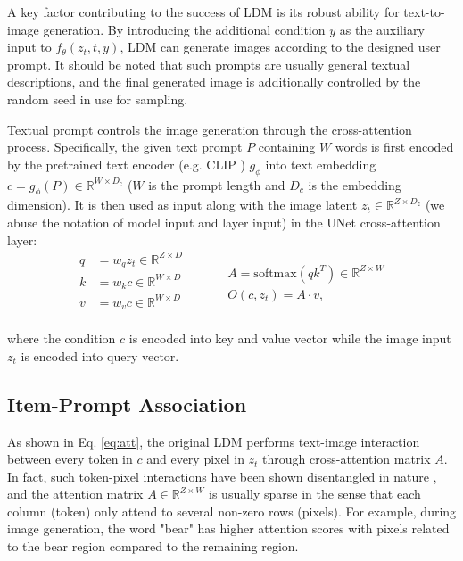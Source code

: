  A key factor contributing to the success of LDM is its robust ability for text-to-image generation.
By introducing the additional condition $y$ as the auxiliary input to $f_\theta(z_t,t,y)$, LDM can generate images according to the designed user prompt. 
It should be noted that such prompts are usually general textual descriptions, and the final generated image is additionally controlled by the random seed in use for sampling. 

Textual prompt controls the image generation through the cross-attention process.
Specifically, the given text prompt $P$ containing $W$ words is first encoded by the pretrained text encoder (e.g. CLIP \cite{radford2021learning}) $g_\phi$ into text embedding $c=g_\phi(P) \in \mathbb{R}^{W\times D_c}$ ($W$ is the prompt length and $D_c$ is the embedding dimension). 
It is then used as input along with the image latent $z_t \in \mathbb{R}^{Z\times D_z}$ (we abuse the notation of model input and layer input) in the UNet cross-attention layer:
\begin{equation}
\label{eq:att}
\begin{split}
q&= w_q z_t \in \mathbb{R}^{Z\times D} \\
k&= w_k c  \in \mathbb{R}^{W\times D}\\
v&= w_v c \in \mathbb{R}^{W\times D} \\
\end{split}
\qquad
\begin{split}
  &A = \text{softmax}(qk^T) \in \mathbb{R}^{Z\times W} \\
 &O(c, z_t) = A\cdot v,
\end{split}
\end{equation}


where the condition $c$ is encoded into key and value vector while the image input $z_t$ is encoded into query vector. 




\subsection{Item-Prompt Association}

As shown in Eq. \ref{eq:att}, the original LDM performs text-image interaction between every token in $c$ and every pixel in $z_t$ through cross-attention matrix $A$.
In fact, such token-pixel interactions have been shown disentangled in nature \cite{tang2022daam, hertz2022prompt}, and the attention matrix $A\in\mathbb{R}^{Z\times W}$ is usually sparse in the sense that each column (token) only attend to several non-zero rows (pixels).
For example, during image generation, the word "bear" has higher attention scores with pixels related to the bear region compared to the remaining region.


